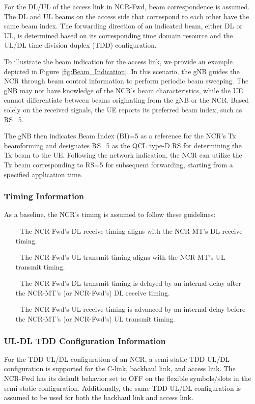 \documentclass[lettersize,journal]{IEEEtran}
\begin{document}
For the DL/UL of the access link in NCR-Fwd, beam correspondence is assumed. The DL and UL beams on the access side that correspond to each other have the same beam index. The forwarding direction of an indicated beam, either DL or UL, is determined based on its corresponding time domain resource and the UL/DL time division duplex (TDD) configuration.

To illustrate the beam indication for the access link, we provide an example depicted in Figure \ref{fig:Beam_Indication}. In this scenario, the gNB guides the NCR through beam control information to perform periodic beam sweeping. The gNB may not have knowledge of the NCR's beam characteristics, while the UE cannot differentiate between beams originating from the gNB or the NCR. Based solely on the received signals, the UE reports its preferred beam index, such as RS=5.

The gNB then indicates Beam Index (BI)=5 as a reference for the NCR's Tx beamforming and designates RS=5 as the QCL type-D RS for determining the Tx beam to the UE. Following the network indication, the NCR can utilize the Tx beam corresponding to RS=5 for subsequent forwarding, starting from a specified application time.

\subsubsection{Timing Information}

As a baseline, the NCR's timing is assumed to follow these guidelines:
\begin{itemize}
\item[-] The NCR-Fwd's DL receive timing aligns with the NCR-MT's DL receive timing.
\item[-] The NCR-Fwd's UL transmit timing aligns with the NCR-MT's UL transmit timing.
\item[-] The NCR-Fwd's DL transmit timing is delayed by an internal delay after the NCR-MT's (or NCR-Fwd's) DL receive timing.
\item[-] The NCR-Fwd's UL receive timing is advanced by an internal delay before the NCR-MT's (or NCR-Fwd's) UL transmit timing.
\end{itemize}

\subsubsection{UL-DL TDD Configuration Information}
For the TDD UL/DL configuration of an NCR, a semi-static TDD UL/DL configuration is supported for the C-link, backhaul link, and access link. The NCR-Fwd has its default behavior set to OFF on the flexible symbols/slots in the semi-static configuration. Additionally, the same TDD UL/DL configuration is assumed to be used for both the backhaul link and access link.
\end{document}

